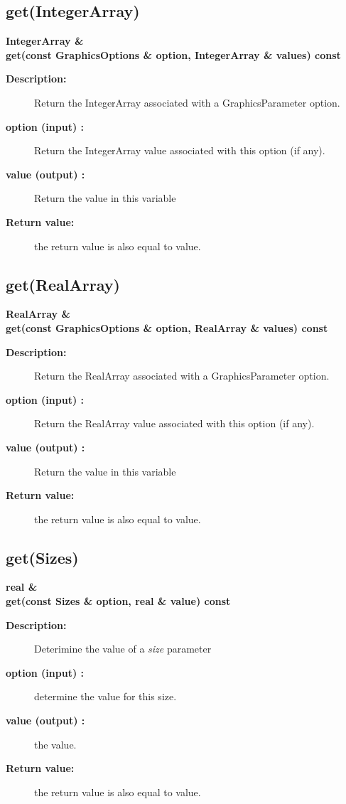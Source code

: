 \subsection{get(IntegerArray)}
 
\begin{flushleft} \textbf{%
IntegerArray \&  \\ 
\settowidth{\GraphicsParametersIncludeArgIndent}{get(}%
get(const GraphicsOptions \& option, IntegerArray \& values) const
}\end{flushleft}
\begin{description}
\item[{\bf Description:}] 
   Return the IntegerArray associated with a GraphicsParameter option.
\item[{\bf option (input) :}]  Return the IntegerArray value associated with this option (if any).
\item[{\bf value (output) :}]  Return the value in this variable
\item[{\bf Return value:}]  the return value is also equal to value.
\end{description}
\subsection{get(RealArray)}
 
\begin{flushleft} \textbf{%
RealArray \&  \\ 
\settowidth{\GraphicsParametersIncludeArgIndent}{get(}%
get(const GraphicsOptions \& option, RealArray \& values) const
}\end{flushleft}
\begin{description}
\item[{\bf Description:}] 
   Return the RealArray associated with a GraphicsParameter option.
\item[{\bf option (input) :}]  Return the RealArray value associated with this option (if any).
\item[{\bf value (output) :}]  Return the value in this variable
\item[{\bf Return value:}]  the return value is also equal to value.
\end{description}
\subsection{get(Sizes)}
 
\begin{flushleft} \textbf{%
real \&  \\ 
\settowidth{\GraphicsParametersIncludeArgIndent}{get(}%
get(const Sizes \& option, real \& value) const
}\end{flushleft}
\begin{description}
\item[{\bf Description:}] 
   Deterimine the value of a {\it size} parameter
\item[{\bf option (input) :}]  determine the value for this size.
\item[{\bf value (output) :}]  the value.
\item[{\bf Return value:}]  the return value is also equal to value.

\end{description}
